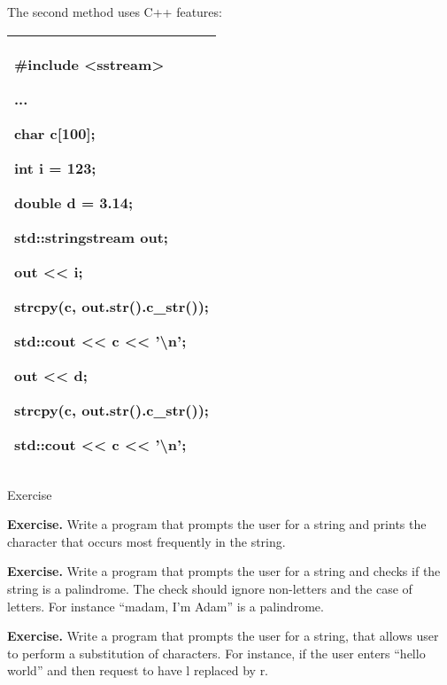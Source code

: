 \documentclass[
]{article}
\begin{document}
The second method uses C++ features:

\begin{longtable}[]{@{}l@{}}
\toprule
\endhead
\begin{minipage}[t]{0.97\columnwidth}\raggedright
\textbf{\#include \textless sstream\textgreater{}}

\textbf{\textbf{}}

\textbf{\textbf{...}}

\textbf{\textbf{}}

\textbf{\textbf{ char c{[}100{]};}}

\textbf{\textbf{ int i = 123;}}

double d = 3.14;

\textbf{\textbf{}}

\textbf{ std::stringstream out;}

\textbf{}

\textbf{ out \textless\textless{} i;}

\textbf{ strcpy(c, out.str().c\_str());}

\textbf{\textbf{ std::cout \textless\textless{} c \textless\textless{}
'\textbackslash n';}}

\textbf{\textbf{}}

\textbf{\textbf{ }out \textless\textless{} d;}

\textbf{ strcpy(c, out.str().c\_str());}

\textbf{\textbf{ std::cout \textless\textless{} c \textless\textless{}
'\textbackslash n';}}\strut
\end{minipage}\tabularnewline
\bottomrule
\end{longtable}

Exercise

\textbf{Exercise.} Write a program that prompts the user for a string
and prints the character that occurs most frequently in the string.

\textbf{Exercise.} Write a program that prompts the user for a string
and checks if the string is a palindrome. The check should ignore
non-letters and the case of letters. For instance ``madam, I'm Adam'' is
a palindrome.

\textbf{Exercise.} Write a program that prompts the user for a string,
that allows user to perform a substitution of characters. For instance,
if the user enters ``hello world'' and then request to have l replaced
by r.
\end{document}
